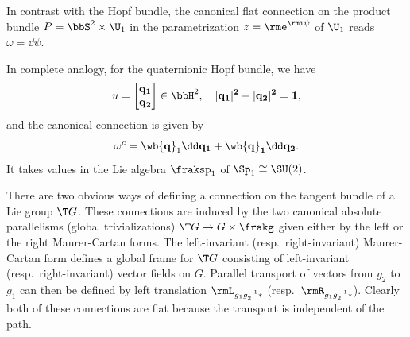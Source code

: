 \begin{example}
    In contrast with the Hopf bundle, the canonical flat connection on the product bundle $P=\bbS^2\times\U_1$ in the parametrization $z=\rme^{\rmi \psi}$ of $\U_1$ reads $\omega=\dd\psi$.

    In complete analogy, for the quaternionic Hopf bundle, we have
    \[u=\begin{bmatrix}
        \bf{q}_1\\\bf{q}_2
    \end{bmatrix}
    \in\bbH^2, \quad |\bf{q}_1|^2 +|\bf{q}_2|^2=1,\]
    and the canonical connection is given by
    \[\omega^c=\wb{\bf{q}}_1\dd\bf{q}_1+\wb{\bf{q}}_1\dd \bf{q}_2.\]
    It takes values in the Lie algebra $\fraksp_1$ of $\Sp_1\cong \SU(2)$.

\end{example}


\begin{example}\label{ex connections on G, part 1}
    There are two obvious ways of defining a connection on the tangent bundle of a Lie group $\T G$. These connections are induced by the two canonical absolute parallelisms (global trivializations) $\T G\to G\times\frakg$ given either by the left or the right Maurer-Cartan forms. The left-invariant (resp.\ right-invariant) Maurer-Cartan form defines a global frame for $\T G$ consisting of left-invariant (resp.\ right-invariant) vector fields on $G$. Parallel transport of vectors from $g_2$ to $g_1$ can then be defined by left translation $\rmL_{g_1g_2^{-1}\ast}$ (resp.\ $\rmR_{g_1g_2^{-1}\ast}$). Clearly both of these connections are flat because the transport is independent of the path.


\end{example}
